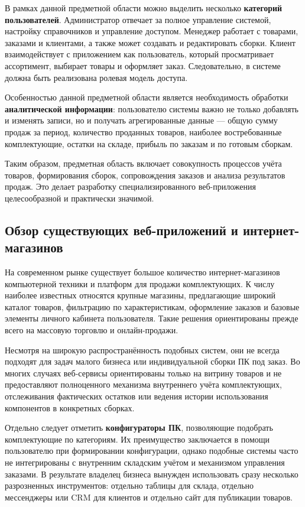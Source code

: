 \documentclass[14pt, a4paper]{extarticle}
\begin{document}
В рамках данной предметной области можно выделить несколько \textbf{категорий пользователей}. Администратор отвечает за полное управление системой, настройку справочников и управление доступом. Менеджер работает с товарами, заказами и клиентами, а также может создавать и редактировать сборки. Клиент взаимодействует с приложением как пользователь, который просматривает ассортимент, выбирает товары и оформляет заказ. Следовательно, в системе должна быть реализована ролевая модель доступа.

Особенностью данной предметной области является необходимость обработки \textbf{аналитической информации}: пользователю системы важно не только добавлять и изменять записи, но и получать агрегированные данные --- общую сумму продаж за период, количество проданных товаров, наиболее востребованные комплектующие, остатки на складе, прибыль по заказам и по готовым сборкам.

Таким образом, предметная область включает совокупность процессов учёта товаров, формирования сборок, сопровождения заказов и анализа результатов продаж. Это делает разработку специализированного веб-приложения целесообразной и практически значимой.

\subsection{Обзор существующих веб-приложений и интернет-магазинов}

На современном рынке существует большое количество интернет-магазинов компьютерной техники и платформ для продажи комплектующих. К числу наиболее известных относятся крупные магазины, предлагающие широкий каталог товаров, фильтрацию по характеристикам, оформление заказов и базовые элементы личного кабинета пользователя. Такие решения ориентированы прежде всего на массовую торговлю и онлайн-продажи.

Несмотря на широкую распространённость подобных систем, они не всегда подходят для задач малого бизнеса или индивидуальной сборки ПК под заказ. Во многих случаях веб-сервисы ориентированы только на витрину товаров и не предоставляют полноценного механизма внутреннего учёта комплектующих, отслеживания фактических остатков или ведения истории использования компонентов в конкретных сборках.

Отдельно следует отметить \textbf{конфигураторы ПК}, позволяющие подобрать комплектующие по категориям. Их преимущество заключается в помощи пользователю при формировании конфигурации, однако подобные системы часто не интегрированы с внутренним складским учётом и механизмом управления заказами. В результате владелец бизнеса вынужден использовать сразу несколько разрозненных инструментов: отдельно таблицы для склада, отдельно мессенджеры или CRM для клиентов и отдельно сайт для публикации товаров.
\end{document}
